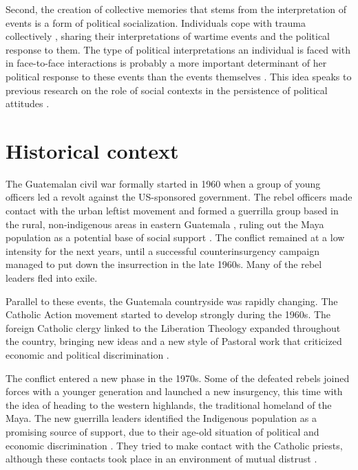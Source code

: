 \documentclass[12pt, notitlepage]{article}
\begin{document}
Second, the creation of collective memories that stems from the interpretation of events is a form of political socialization.
Individuals cope with trauma collectively \citep{Lyons:1998aa}, sharing their interpretations of wartime events and the political response to them.
The type of political interpretations an individual is faced with in face-to-face interactions is probably a more important determinant of her political response to these events than the events themselves \citep{Dyrstad:2012aa, Molina:2014aa, Glaurdic:2016aa}.
This idea speaks to previous research on the role of social contexts in the persistence of political attitudes \citep{Wittenberg:2006aa, Tavits:2013aa}.


\section*{Historical context}

The Guatemalan civil war formally started in 1960 when a group of young officers led a revolt against the US-sponsored government.
The rebel officers made contact with the urban leftist movement and formed a guerrilla group based in the rural, non-indigenous areas in eastern Guatemala \citep{Arias:1992aa}, ruling out the Maya population as a potential base of social support \citep{Smith:1990ab}.
The conflict remained at a low intensity for the next years, until a successful counterinsurgency campaign managed to put down the insurrection in the late 1960s.
Many of the rebel leaders fled into exile.

Parallel to these events, the Guatemala countryside was rapidly changing.
The Catholic Action movement started to develop strongly during the 1960s.
The foreign Catholic clergy linked to the Liberation Theology expanded throughout the country, bringing new ideas and a new style of Pastoral work that criticized economic and political discrimination \citep{Arias:1992aa, Nelson:2009aa, Stoll:1999aa}.

The conflict entered a new phase in the 1970s.
Some of the defeated rebels joined forces with a younger generation and launched a new insurgency, this time with the idea of heading to the western highlands, the traditional homeland of the Maya.
The new guerrilla leaders identified the Indigenous population as a promising source of support, due to their age-old situation of political and economic discrimination \citep{Payeras:1981aa, Arias:1992aa}.
They tried to make contact with the Catholic priests, although these contacts took place in an environment of mutual distrust \citep[e.g.][]{Manz:2004aa}.
\end{document}
